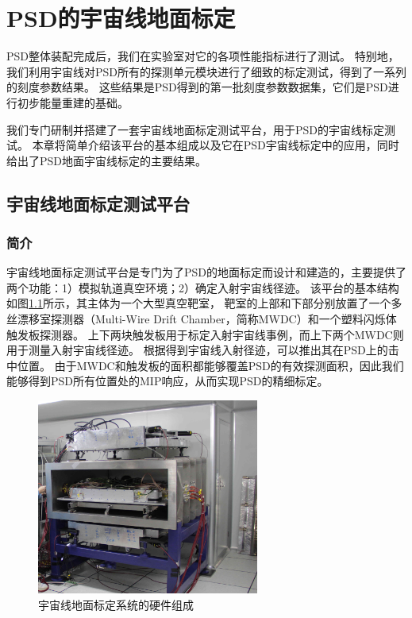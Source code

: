 \chapter{PSD的宇宙线地面标定}
\label{ch:cosmic_ray}
PSD整体装配完成后，我们在实验室对它的各项性能指标进行了测试。
特别地，我们利用宇宙线对PSD所有的探测单元模块进行了细致的标定测试，得到了一系列的刻度参数结果。
这些结果是PSD得到的第一批刻度参数数据集，它们是PSD进行初步能量重建的基础。

我们专门研制并搭建了一套宇宙线地面标定测试平台，用于PSD的宇宙线标定测试。
本章将简单介绍该平台的基本组成以及它在PSD宇宙线标定中的应用，同时给出了PSD地面宇宙线标定的主要结果。

\section{宇宙线地面标定测试平台}
\label{sec:cosmic_ray:cm_system}
\subsection{简介}
\label{sec:cosmic_ray:introduction}
宇宙线地面标定测试平台是专门为了PSD的地面标定而设计和建造的，主要提供了两个功能：1）模拟轨道真空环境；2）确定入射宇宙线径迹。
该平台的基本结构如图\ref{fig:cosmic_ray:cm_system}所示，其主体为一个大型真空靶室，
靶室的上部和下部分别放置了一个多丝漂移室探测器（Multi-Wire Drift Chamber，简称MWDC）和一个塑料闪烁体触发板探测器。
上下两块触发板用于标定入射宇宙线事例，而上下两个MWDC则用于测量入射宇宙线径迹。
根据得到宇宙线入射径迹，可以推出其在PSD上的击中位置。
由于MWDC和触发板的面积都能够覆盖PSD的有效探测面积，因此我们能够得到PSD所有位置处的MIP响应，从而实现PSD的精细标定。
\begin{figure}[htbp]
	\centering
	\includegraphics[width=0.65\textwidth]{chap/cosmic_ray/fig/cm_system.jpg}
	\caption{宇宙线地面标定系统的硬件组成}
	\label{fig:cosmic_ray:cm_system}
\end{figure}

